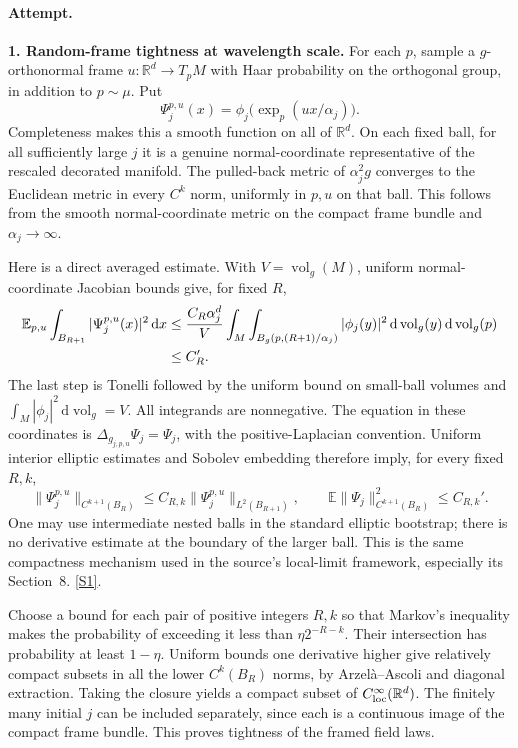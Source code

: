 \documentclass[11pt,a4paper]{article}
\newcommand{\R}{\mathbb{R}}
\newcommand{\E}{\mathbb{E}}
\newcommand{\dd}{\,\mathrm d}
\newcommand{\sref}[2]{\hyperlink{source:#1:#2}{[S#2]}}
\numberwithin{equation}{section}
\begin{document}
\paragraph{Attempt.}
\textbf{1. Random-frame tightness at wavelength scale.}
For each $p$, sample a $g$-orthonormal frame $u:\R^d\to T_pM$ with Haar
probability on the orthogonal group, in addition to $p\sim\mu$. Put
\[
 \Psi_j^{p,u}(x)=\phi_j\bigl(\exp_p(u x/\alpha_j)\bigr).
\]
Completeness makes this a smooth function on all of $\R^d$. On each fixed
ball, for all sufficiently large $j$ it is a genuine normal-coordinate
representative of the rescaled decorated manifold. The pulled-back
metric of $\alpha_j^2g$ converges to the Euclidean metric in every
$C^k$ norm, uniformly in $p,u$ on that ball. This follows from the smooth
normal-coordinate metric on the compact frame bundle and
$\alpha_j\to\infty$.

Here is a direct averaged estimate. With $V=\operatorname{vol}_g(M)$,
uniform normal-coordinate Jacobian bounds give, for fixed $R$,
\begin{align}
 \E_{p,u}\int_{B_{R+1}}|\Psi_j^{p,u}(x)|^2\dd x
 &\leq \frac{C_R\alpha_j^d}{V}
       \int_M\int_{B_g(p,(R+1)/\alpha_j)}|\phi_j(y)|^2
                                      \dd\operatorname{vol}_g(y)
                                      \dd\operatorname{vol}_g(p)
       \notag\\
 &\leq C_R'.\label{30006801:average}
\end{align}
The last step is Tonelli followed by the uniform bound on small-ball
volumes and $\int_M|\phi_j|^2\dd\operatorname{vol}_g=V$.
All integrands are nonnegative. The equation in these coordinates is
$\Delta_{g_{j,p,u}}\Psi_j=\Psi_j$, with the positive-Laplacian
convention. Uniform interior elliptic estimates and Sobolev embedding
therefore imply, for every fixed $R,k$,
\begin{equation}\label{30006801:regularity}
 \|\Psi_j^{p,u}\|_{C^{k+1}(B_R)}
       \leq C_{R,k}\|\Psi_j^{p,u}\|_{L^2(B_{R+1})},\qquad
 \E\|\Psi_j\|_{C^{k+1}(B_R)}^2\leq C_{R,k}'.
\end{equation}
One may use intermediate nested balls in the standard elliptic bootstrap;
there is no derivative estimate at the boundary of the larger ball.
This is the same compactness mechanism used in the source's local-limit
framework, especially its Section~8. \sref{30006801}{1}.

Choose a bound for each pair of positive integers $R,k$ so that Markov's
inequality makes the probability of exceeding it less than
$\eta 2^{-R-k}$. Their intersection has probability at least $1-\eta$.
Uniform bounds one derivative higher give relatively compact subsets in
all the lower $C^k(B_R)$ norms, by Arzel\`a--Ascoli and diagonal extraction.
Taking the closure yields a compact subset of $C^\infty_{\rm loc}(\R^d)$.
The finitely many initial $j$ can be included separately, since each is
a continuous image of the compact frame bundle. This proves tightness
of the framed field laws.
\end{document}

